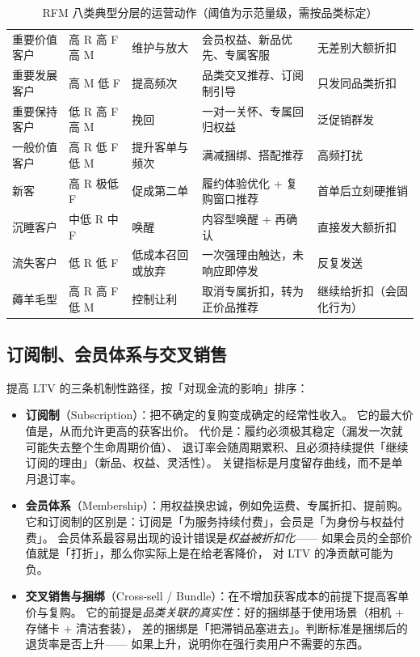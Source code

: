 \begin{table}[htbp]
\centering
\caption{RFM 八类典型分层的运营动作（阈值为示范量级，需按品类标定）}
\label{tab:rfm-segments}
\small
\begin{tabularx}{\textwidth}{L{2.1cm} L{2.4cm} L{3.2cm} L{3.2cm} Y}
\toprule
{} &  &  &  &  \\
\midrule
重要价值客户 & 高 R 高 F 高 M & 维护与放大 & 会员权益、新品优先、专属客服 & 无差别大额折扣 \\
\addlinespace
重要发展客户 & 高 M 低 F & 提高频次 & 品类交叉推荐、订阅制引导 & 只发同品类折扣 \\
\addlinespace
重要保持客户 & 低 R 高 F 高 M & 挽回 & 一对一关怀、专属回归权益 & 泛促销群发 \\
\addlinespace
一般价值客户 & 高 R 低 F 低 M & 提升客单与频次 & 满减捆绑、搭配推荐 & 高频打扰 \\
\addlinespace
新客 & 高 R 极低 F & 促成第二单 & 履约体验优化 + 复购窗口推荐 & 首单后立刻硬推销 \\
\addlinespace
沉睡客户 & 中低 R 中 F & 唤醒 & 内容型唤醒 + 再确认 & 直接发大额折扣 \\
\addlinespace
流失客户 & 低 R 低 F & 低成本召回或放弃 & 一次强理由触达，未响应即停发 & 反复发送 \\
\addlinespace
薅羊毛型 & 高 R 高 F 低 M & 控制让利 & 取消专属折扣，转为正价品推荐 & 继续给折扣（会固化行为） \\
\bottomrule
\end{tabularx}
\end{table}

\subsection{订阅制、会员体系与交叉销售}

提高 LTV 的三条机制性路径，按「对现金流的影响」排序：

\begin{itemize}
  \item \textbf{订阅制}（Subscription）：把不确定的复购变成确定的经常性收入。
        它的最大价值是，从而允许更高的获客出价。
        代价是：履约必须极其稳定（漏发一次就可能失去整个生命周期价值）、
        退订率会随周期累积、且必须持续提供「继续订阅的理由」（新品、权益、灵活性）。
        关键指标是月度留存曲线，而不是单月退订率。
  \item \textbf{会员体系}（Membership）：用权益换忠诚，例如免运费、专属折扣、提前购。
        它和订阅制的区别是：订阅是「为服务持续付费」，会员是「为身份与权益付费」。
        会员体系最容易出现的设计错误是\emph{权益被折扣化}——
        如果会员的全部价值就是「打折」，那么你实际上是在给老客降价，
        对 LTV 的净贡献可能为负。
  \item \textbf{交叉销售与捆绑}（Cross-sell / Bundle）：在不增加获客成本的前提下提高客单价与复购。
        它的前提是\emph{品类关联的真实性}：好的捆绑基于使用场景（相机 + 存储卡 + 清洁套装），
        差的捆绑是「把滞销品塞进去」。判断标准是捆绑后的退货率是否上升——
        如果上升，说明你在强行卖用户不需要的东西。
\end{itemize}

